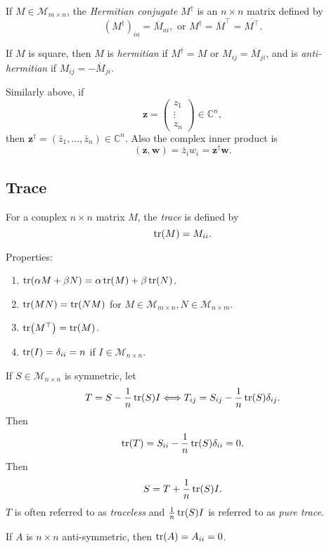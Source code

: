 \documentclass[10pt]{article}
\begin{document}
    \begin{definition}
        If $ M\in \mathcal{M}_{m\times n} $, the \textit{Hermitian conjugate} $ M^\dagger  $ is an $n\times n$ matrix defined by 
        \[
            (M^\dagger )_{ia}=\overline{M}_{ai}, \text{ or } M^\dagger =\overline{M}^{\top}=\overline{M^{\top}}
        .\]

        If $M$ is square, then $M$ is \textit{hermitian} if $ M^\dagger =M $ or $ M_{ij}=\overline{M}_{ji} $, and is \textit{anti-hermitian} if $ M_{ij}=-\overline{M}_{ji} $.
    \end{definition}
    Similarly above, if 
    \[
        \mathbf{z}=\begin{pmatrix}
            z_1\\\vdots\\z_n
        \end{pmatrix}\in \mathbb{C}^{n},
    \]
    then $ \mathbf{z}^\dagger = (\bar{z}_1,\dots, \bar{z}_n)\in \mathbb{C}^{n} $. Also the complex inner product is
    \[
        (\mathbf{z},\mathbf{w})=\bar{z}_i w_i=\mathbf{z}^\dagger \mathbf{w}
    .\]
    \subsection{Trace}
    \begin{definition}
        For a complex $ n \times n $ matrix $M$, the \textit{trace} is defined by 
        \[
            \trace(M)=M_{ii}
        .\]
    \end{definition}
    Properties:
    \begin{enumerate}
        \item $ \tr(\alpha M+ \beta N)=\alpha \tr(M)+\beta \tr(N) $.
        \item $ \tr(MN)=\tr(NM) $ for $ M\in \mathcal{M}_{m\times n}, N\in \mathcal{M}_{n\times m} $.
        \item $ \tr(M^{\top})=\tr(M) $.
        \item $ \tr(I)=\delta_{ii}=n $ if $ I\in \mathcal{M}_{n\times n} $.
    \end{enumerate}
    If $ S\in \mathcal{M}_{n\times n} $ is symmetric, let 
    \[
        T=S-\frac{1}{n}\tr(S)I \Longleftrightarrow T_{ij}=S_{ij}-\frac{1}{n}\tr(S)\delta_{ij}
    .\]
    Then
    \[
        \tr(T)=S_{ii}-\frac{1}{n}\tr(S)\delta_{ii}=0
    .\]
    Then 
    \[
        S=T+\frac{1}{n}\tr(S)I
    .\]
    $T$ is often referred to as \textit{traceless} and $ \frac{1}{n}\tr(S)I $ is referred to as \textit{pure trace}.
    \begin{remark}
        If $A$ is $ n \times n $ anti-symmetric, then $ \tr(A)=A_{ii}=0 $.
    \end{remark}
\end{document}
